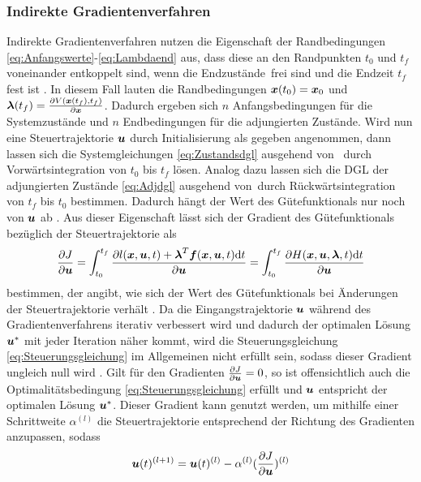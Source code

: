 \subsubsection{Indirekte Gradientenverfahren}\label{subsubsec:Gradientenverfahren_indirekt}
Indirekte Gradientenverfahren nutzen die Eigenschaft der Randbedingungen \eqref{eq:Anfangswerte}-\eqref{eq:Lambdaend} aus, dass diese an den Randpunkten $t_0$ und $t_f$ voneinander entkoppelt sind, wenn die Endzustände \xoftf\,frei sind und die Endzeit $t_f$ fest ist \cite{KnutGraichen.2012}. In diesem Fall lauten die Randbedingungen $\boldsymbol{x}(t_0) = \boldsymbol{x}_0$ und $\boldsymbol{\lambda}(t_f) = \frac{\partial V(\boldsymbol{x}(t_f),t_f)}{\partial \boldsymbol{x}}$. Dadurch ergeben sich $n$ Anfangsbedingungen für die Systemzustände und $n$ Endbedingungen für die adjungierten Zustände. Wird nun eine Steuertrajektorie $\boldsymbol{u}$ durch Initialisierung als gegeben angenommen, dann lassen sich die Systemgleichungen \eqref{eq:Zustandsdgl} ausgehend von \xzero\, durch Vorwärtsintegration von $t_0$ bis $t_f$ lösen. Analog dazu lassen sich die \gls{DGL} der adjungierten Zustände \eqref{eq:Adjdgl} ausgehend von \lambdaoftf\,durch Rückwärtsintegration von $t_f$ bis $t_0$ bestimmen. Dadurch hängt der Wert des Gütefunktionals nur noch von $\boldsymbol{u}$ ab \cite{Papageorgiou.2012}. Aus dieser Eigenschaft lässt sich der Gradient des Gütefunktionals bezüglich der Steuertrajektorie als
\begin{equation}
	\frac{\partial J}{\partial \boldsymbol{u}} = \int_{t_0}^{t_f}\frac{\partial l(\boldsymbol{x},\boldsymbol{u},t) + \boldsymbol{\lambda}^T\boldsymbol{f}(\boldsymbol{x},\boldsymbol{u},t)\textrm{d}{t}}{\partial \boldsymbol{u}} = \int_{t_0}^{t_f}\frac{\partial H(\boldsymbol{x},\boldsymbol{u},\boldsymbol{\lambda},t)\textrm{d}{t}}{\partial \boldsymbol{u}}
\end{equation}
bestimmen, der angibt, wie sich der Wert des Gütefunktionals bei Änderungen der Steuertrajektorie verhält \cite{Papageorgiou.2012}. Da die Eingangstrajektorie $\boldsymbol{u}$ während des Gradientenverfahrens iterativ verbessert wird und dadurch der optimalen Lösung $\boldsymbol{u}^*$ mit jeder Iteration näher kommt, wird die Steuerungsgleichung \eqref{eq:Steuerungsgleichung} im Allgemeinen nicht erfüllt sein, sodass dieser Gradient ungleich null wird \cite{KnutGraichen.2012}. Gilt für den Gradienten $\frac{\partial J}{\partial \boldsymbol{u}} = 0$, so ist offensichtlich auch die Optimalitätsbedingung \eqref{eq:Steuerungsgleichung} erfüllt und $\boldsymbol{u}$ entspricht der optimalen Lösung $\boldsymbol{u}^*$. Dieser Gradient kann genutzt werden, um mithilfe einer Schrittweite $\alpha^{(l)}$ die Steuertrajektorie entsprechend der Richtung des Gradienten anzupassen, sodass  
\begin{equation}
\boldsymbol{u}(t)^{(l+1)} = \boldsymbol{u}(t)^{(l)} - \alpha^{(l)}(\frac{\partial J}{\partial \boldsymbol{u}})^{(l)}
\end{equation}
